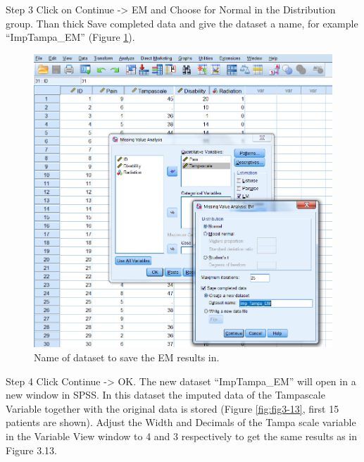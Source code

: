 \documentclass[]{book}
\theoremstyle{definition}
\theoremstyle{definition}
\theoremstyle{definition}
\theoremstyle{remark}
\begin{document}
Step 3 Click on Continue -\textgreater{} EM and Choose for Normal in the
Distribution group. Than thick Save completed data and give the dataset
a name, for example ``ImpTampa\_EM'' (Figure \ref{fig:fig3-12}).

\begin{figure}

{\centering \includegraphics[width=0.9\linewidth]{images/fig3.12} 

}

\caption{Name of dataset to save the EM results in.}\label{fig:fig3-12}
\end{figure}

Step 4 Click Continue -\textgreater{} OK. The new dataset
``ImpTampa\_EM'' will open in a new window in SPSS. In this dataset the
imputed data of the Tampascale Variable together with the original data
is stored (Figure \ref{fig:fig3-13}, first 15 patients are shown).
Adjust the Width and Decimals of the Tampa scale variable in the
Variable View window to 4 and 3 respectively to get the same results as
in Figure 3.13.
\end{document}
